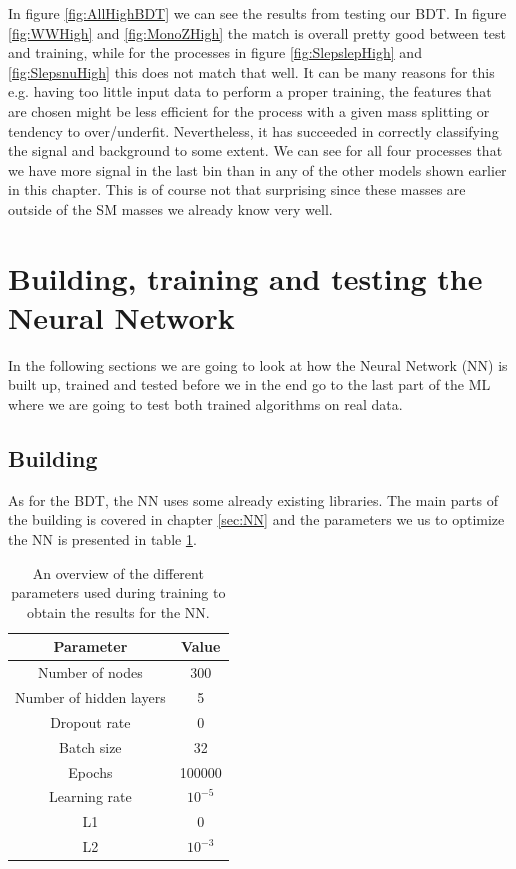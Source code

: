 In figure \ref{fig:AllHighBDT} we can see the results from testing our BDT. In figure \ref{fig:WWHigh} and \ref{fig:MonoZHigh} the match is overall pretty good between test and training, while for the processes in figure \ref{fig:SlepslepHigh} and \ref{fig:SlepsnuHigh} this does not match that well. It can be many reasons for this e.g. having too little input data to perform a proper training, the features that are chosen might be less efficient for the process with a given mass splitting or tendency to over/underfit. Nevertheless, it has succeeded in correctly classifying the signal and background to some extent. We can see for all four processes that we have more signal in the last bin than in any of the other models shown earlier in this chapter. This is of course not that surprising since these masses are outside of the SM masses we already know very well.



\section{Building, training and testing the Neural Network}
In the following sections we are going to look at how the Neural Network (NN) is built up, trained and tested before we in the end go to the last part of the ML where we are going to test both trained algorithms on real data.

\subsection{Building}
As for the BDT, the NN uses some already existing libraries. The main parts of the building is covered in chapter \ref{sec:NN} and the parameters we us to optimize the NN is presented in table \ref{tab:parametersNN}.

\begin{table}[H]
    \centering
    \renewcommand{\arraystretch}{1.}
    \begin{tabular}{c c}
    \toprule
        \textbf{Parameter} & \textbf{Value}\\
        \midrule
        \midrule
        Number of nodes & 300  \\
        Number of hidden layers & 5\\
        Dropout rate & 0\\
        Batch size & 32\\
        Epochs & 100000\\
        Learning rate & $10^{-5}$\\
        L1 & 0\\
        L2 & $10^{-3}$\\
        \bottomrule
    \end{tabular}
    \caption{An overview of the different parameters used during training to obtain the results for the NN.}
    \label{tab:parametersNN}
\end{table}

